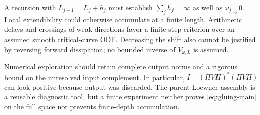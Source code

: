 A recursion with $L_{j+1}=L_j+h_j$ must establish
$\sum_jh_j=\infty$ as well as $\omega_j\downarrow0$.
Local extendibility could otherwise accumulate at a finite length.
Arithmetic delays and crossings of weak directions favor a finite
step criterion over an assumed smooth critical-curve ODE.
Decreasing the shift also cannot be justified by reversing forward
dissipation; no bounded inverse of $V_{\omega,L}$ is assumed.

Numerical exploration should retain complete output norms and a
rigorous bound on the unresolved input complement. In particular,
$I-(\Pi V\Pi)^*(\Pi V\Pi)$ can look positive because output was
discarded. The parent Loewner assembly is a reusable diagnostic
tool, but a finite experiment neither proves
\eqref{eq:gluing-main} on the full space nor prevents finite-depth
accumulation.
